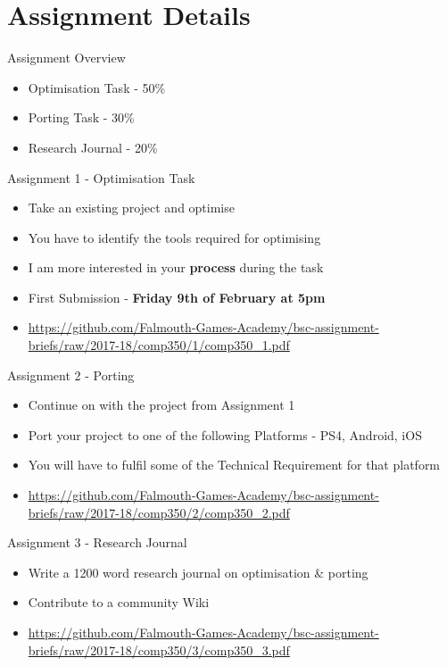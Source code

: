 \part{Assignment Details}
\frame{\partpage}

\begin{frame}{Assignment Overview}
	\begin{itemize}
		\item Optimisation Task - 50\%
		\item Porting Task - 30\%
		\item Research Journal  - 20\%
	\end{itemize}
\end{frame}

\begin{frame}{Assignment 1 - Optimisation Task}
	\begin{itemize}
		\item Take an existing project and optimise
		\item You have to identify the tools required for optimising
		\item I am more interested in your \textbf{process} during the task
		\item First Submission - \textbf{Friday 9th of February at 5pm}
		\item \url{https://github.com/Falmouth-Games-Academy/bsc-assignment-briefs/raw/2017-18/comp350/1/comp350_1.pdf}
	\end{itemize}
\end{frame}

\begin{frame}{Assignment 2 - Porting }
	\begin{itemize}
		\item Continue on with the project from Assignment 1
		\item Port your project to one of the following Platforms - PS4, Android, iOS
		\item You will have to fulfil some of the Technical Requirement for that platform
		\item  \url{https://github.com/Falmouth-Games-Academy/bsc-assignment-briefs/raw/2017-18/comp350/2/comp350_2.pdf}
	\end{itemize}
\end{frame}

\begin{frame}{Assignment 3 - Research Journal }
	\begin{itemize}
		\item Write a 1200 word research journal on optimisation \& porting 
		\item Contribute to a community Wiki
		\item \url{https://github.com/Falmouth-Games-Academy/bsc-assignment-briefs/raw/2017-18/comp350/3/comp350_3.pdf}
	\end{itemize}
\end{frame}